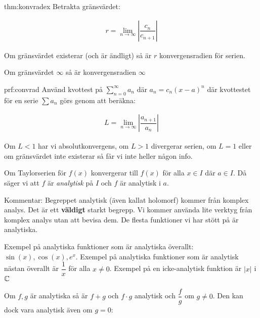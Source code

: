 \begin{theo}{thm:konvradex}
  \noindent Betrakta gränsvärdet:

  \begin{equation*}
    \begin{gathered}
      r = \lim_{n\to\infty}\left|\dfrac{c_n}{c_{n+1}}\right|
    \end{gathered}
  \end{equation*}
  \par\bigskip
  \noindent Om gränsvärdet existerar (och är ändligt) så är $r$ konvergensradien för serien.\par
  \noindent Om gränsvärdet $\infty$ så är konvergensradien $\infty$
\end{theo}
\par\bigskip
\begin{prf}[Konvergensradie]{prf:convrad}
  \noindent Använd kvottest på $\sum_{n=0}^{\infty}a_n$ där $a_n = c_n(x-a)^n$ där kvottestet för en serie $\sum a_n$ görs genom att beräkna:

  \begin{equation*}
    \begin{gathered}
      L = \lim_{n\to\infty}\left|\dfrac{a_{n+1}}{a_n}\right|
    \end{gathered}
  \end{equation*}
  \par\bigskip
\noindent Om $L< 1$ har vi absolutkonvergens, om $L>1$ divergerar serien, om $L=1$ eller om gränsvärdet inte existerar så får vi inte heller någon info.

\end{prf}
\par\bigskip
\noindent Om Taylorserien för $f(x)$ konvergerar till $f(x)$ för alla $x\in I$ där $a\in I$. Då säger vi att $f$ är \textit{analytisk} på $I$ och $f$ är analytisk i $a$.
\par\bigskip
\noindent Kommentar: Begreppet analytisk (även kallat holomorf) kommer från komplex analys. Det är ett \textbf{väldigt} starkt begrepp. Vi kommer använda lite verktyg från komplex analys utan att bevisa dem. De flesta funktioner vi har stött på är analytiska.
\par\bigskip
\noindent Exempel på analytiska funktioner som är analytiska överallt: $\sin(x), \cos(x), e^x$. Exempel på analytiska funktioner som är analytisk nästan överallt är $\dfrac{1}{x}$ för alla $x\neq0$. Exempel på en icke-analytisk funktion är $\left|x\right|$ i $\mathbb{C}$
\par\bigskip
\noindent Om $f, g$ är analytiska så är $f+g$ och $f\cdot g$ analytisk och $\dfrac{f}{g}$ om $g\neq0$. Den kan dock vara analytisk även om $g=0$:
\par\bigskip

